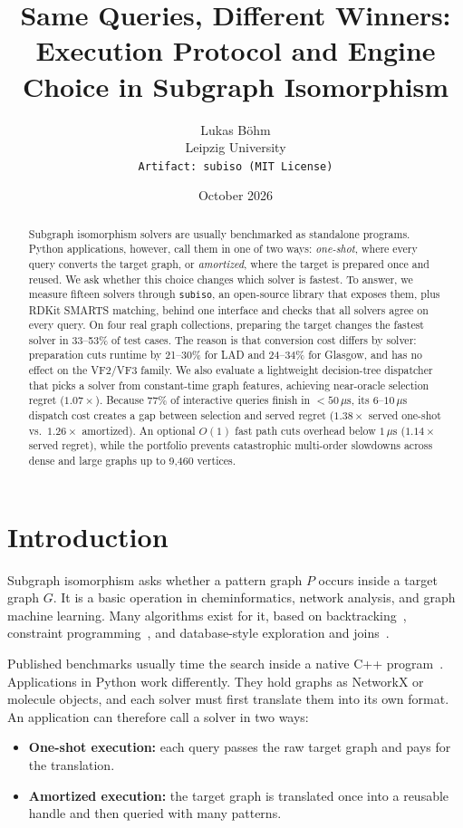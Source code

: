 \documentclass[11pt,a4paper]{article}
\title{\textbf{Same Queries, Different Winners:\\Execution Protocol and Engine Choice in Subgraph Isomorphism}}
\author{Lukas B{\"o}hm\\[0.3em]
\small Leipzig University\\
\small \texttt{Artifact: subiso (MIT License)}}
\date{October 2026}
\begin{document}
\maketitle

\begin{abstract}
\noindent
Subgraph isomorphism solvers are usually benchmarked as standalone programs. Python applications, however, call them in one of two ways: \emph{one-shot}, where every query converts the target graph, or \emph{amortized}, where the target is prepared once and reused. We ask whether this choice changes which solver is fastest. To answer, we measure fifteen solvers through \texttt{subiso}, an open-source library that exposes them, plus RDKit SMARTS matching, behind one interface and checks that all solvers agree on every query. On four real graph collections, preparing the target changes the fastest solver in 33--53\% of test cases. The reason is that conversion cost differs by solver: preparation cuts runtime by 21--30\% for LAD and 24--34\% for Glasgow, and has no effect on the VF2/VF3 family. We also evaluate a lightweight decision-tree dispatcher that picks a solver from constant-time graph features, achieving near-oracle selection regret ($1.07\times$). Because 77\% of interactive queries finish in $<50\,\mu\text{s}$, its $6\text{--}10\,\mu\text{s}$ dispatch cost creates a gap between selection and served regret ($1.38\times$ served one-shot vs.\ $1.26\times$ amortized). An optional $O(1)$ fast path cuts overhead below $1\,\mu\text{s}$ ($1.14\times$ served regret), while the portfolio prevents catastrophic multi-order slowdowns across dense and large graphs up to 9,460 vertices.
\end{abstract}

\section{Introduction}

Subgraph isomorphism asks whether a pattern graph $P$ occurs inside a target graph $G$. It is a basic operation in cheminformatics, network analysis, and graph machine learning. Many algorithms exist for it, based on backtracking~\cite{ullmann1976,cordella2004vf2,juttner2018vf2pp,carletti2018vf3,bonnici2013ri}, constraint programming~\cite{solnon2010lad,mccreesh2015glasgow}, and database-style exploration and joins~\cite{han2013turboiso,bi2016cflmatch,bhattarai2019ceci,han2019dpiso,sun2020indepth}.

Published benchmarks usually time the search inside a native C++ program~\cite{lee2013comparison,sun2020indepth,zhang2024survey,jiang2025survey}. Applications in Python work differently. They hold graphs as NetworkX or molecule objects, and each solver must first translate them into its own format. An application can therefore call a solver in two ways:
\begin{itemize}
    \item \textbf{One-shot execution:} each query passes the raw target graph and pays for the translation.
    \item \textbf{Amortized execution:} the target graph is translated once into a reusable handle and then queried with many patterns.
\end{itemize}
\end{document}

